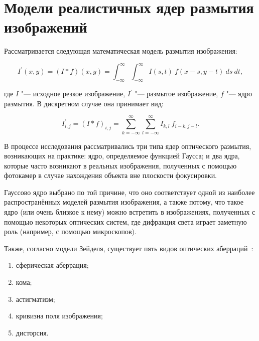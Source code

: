 \section{Модели реалистичных ядер размытия изображений}


Рассматривается следующая математическая модель размытия изображения:

\begin{equation*}
	I^\prime \left(x, y\right) = \left(I \ast f\right) \left(x, y\right) = \int_{-\infty}^{\infty}\int_{-\infty}^{\infty}{I\left(s,t\right)\ f\left(x-s,y-t\right)\ ds\ dt},
\end{equation*}

\noindent где $I$ "--- исходное резкое изображение, $I^\prime$ "--- размытое изображение, $f$ "--- ядро размытия. В дискретном случае она принимает вид:

\begin{equation*}
	I^\prime_{i,j} = \left(I \ast f\right)_{i,j} = \sum_{k=-\infty}^{\infty} \sum_{l=-\infty}^{\infty}{I_{k,l}\ f_{i-k,j-l}}.
\end{equation*}

В процессе исследования рассматривались три типа ядер оптического размытия, возникающих на практике: ядро, определяемое функцией Гаусса; и два ядра, которые часто возникают в реальных изображения, полученных с помощью фотокамер в случае нахождения объекта вне плоскости фокусировки.

Гауссово ядро выбрано по той причине, что оно соответствует одной из наиболее распространённых моделей размытия изображения, а также потому, что такое ядро (или очень близкое к нему) можно встретить в изображениях, полученных с помощью некоторых оптических систем, где дифракция света играет заметную роль (например, с помощью микроскопов).

Также, согласно модели Зейделя, существует пять видов оптических аберраций~\cite{simpkins2014parameterized}:
\begin{enumerate}[beginpenalty=10000]
	\item сферическая аберрация;
	\item кома;
	\item астигматизм;
	\item кривизна поля изображения;
	\item дисторсия.
\end{enumerate}


